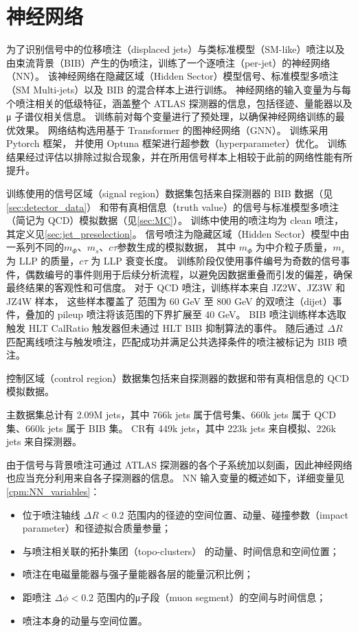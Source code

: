
\chapter{神经网络}
\label{chap:NN}

为了识别信号中的位移喷注（displaced jets）与类标准模型（SM-like）喷注以及由束流背景（BIB）产生的伪喷注，训练了一个逐喷注（per-jet）的神经网络（NN）。
该神经网络在隐藏区域（Hidden Sector）模型信号、标准模型多喷注（SM Multi-jets）以及 BIB 的混合样本上进行训练。
神经网络的输入变量为与每个喷注相关的低级特征，涵盖整个 ATLAS 探测器的信息，包括径迹、量能器以及 μ 子谱仪相关信息。
训练前对每个变量进行了预处理，以确保神经网络训练的最优效果。
网络结构选用基于 Transformer\cite{vaswani2023attentionneed} 的图神经网络（GNN）。
训练采用 Pytorch\cite{paszke2019pytorchimperativestylehighperformance} 框架，
并使用 Optuna\cite{akiba2019optunanextgenerationhyperparameteroptimization} 框架进行超参数（hyperparameter）优化。
训练结果经过评估以排除过拟合现象，并在所用信号样本上相较于此前的网络性能有所提升。

训练使用的信号区域（signal region）数据集包括来自探测器的 BIB 数据（见\autoref{sec:detector_data}）
和带有真相信息（truth value）的信号与标准模型多喷注（简记为 QCD）模拟数据（见\autoref{sec:MC}）。
训练中使用的喷注均为 clean 喷注，其定义见\autoref{sec:jet_preselection}。
信号喷注为隐藏区域（Hidden Sector）模型中由一系列不同的$m_\Phi$、$m_s$、$c\tau$参数生成的模拟数据，
其中 $m_\Phi$ 为中介粒子质量，$m_s$ 为 LLP 的质量，$c\tau$ 为 LLP 衰变长度。
训练阶段仅使用事件编号为奇数的信号事件，偶数编号的事件则用于后续分析流程，以避免因数据重叠而引发的偏差，确保最终结果的客观性和可信度。
对于 QCD 喷注，训练样本来自 JZ2W、JZ3W 和 JZ4W 样本，
这些样本覆盖了 \pt 范围为 60 GeV 至 800 GeV 的双喷注（dijet）事件，叠加的 pileup 喷注将该范围的下界扩展至 40 GeV。
BIB 喷注训练样本选取触发 HLT CalRatio 触发器但未通过 HLT BIB 抑制算法的事件。
随后通过 $\Delta R$ 匹配离线喷注与触发喷注，匹配成功并满足公共选择条件的喷注被标记为 BIB 喷注。

控制区域（control region）数据集包括来自探测器的数据和带有真相信息的 QCD 模拟数据。

主数据集总计有 2.09M jets，其中 766k jets 属于信号集、660k jets 属于 QCD 集、660k jets 属于 BIB 集。
CR有 449k jets，其中 223k jets 来自模拟、226k jets 来自探测器。

由于信号与背景喷注可通过 ATLAS 探测器的各个子系统加以刻画，因此神经网络也应当充分利用来自各子探测器的信息。
NN 输入变量的概述如下，详细变量见\autoref{cpm:NN_variables}：
\begin{itemize}
      \item 位于喷注轴线 $\Delta R < 0.2$ 范围内的径迹的空间位置、动量、碰撞参数（impact parameter）和径迹拟合质量参量；
      \item 与喷注相关联的拓扑集团（topo-clusters） 的动量、时间信息和空间位置；
      \item 喷注在电磁量能器与强子量能器各层的能量沉积比例；
      \item 距喷注 $\Delta \phi < 0.2$ 范围内的μ子段（muon segment）的空间与时间信息；
      \item 喷注本身的动量与空间位置。
\end{itemize}

